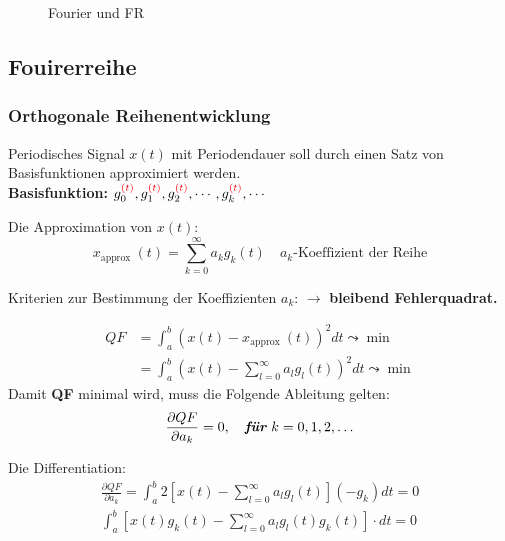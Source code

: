 \begin{figure}[H]
    \centering
    \subfigbottomskip=10pt
    \subfigcapskip=3pt
    \caption{Fourier und FR}
    \label{fig:Fourier und FR}
\end{figure}


\subsection{\textbf{Fouirerreihe}}
\subsubsection{\textbf{Orthogonale Reihenentwicklung}}
Periodisches Signal $x(t)$ mit Periodendauer soll durch einen Satz von Basisfunktionen approximiert werden.\\
\textbf{Basisfunktion:} $g_0^{\textcolor{red}{(t)}},g_1^{\textcolor{red}{(t)}},g_2^{\textcolor{red}{(t)}},\cdots,g_k^{\textcolor{red}{(t)}},\cdots$

Die Approximation von $x(t)$:\\
\begin{equation}
    x_{\text {approx }}(t)=\sum_{k=0}^{\infty} a_{k} g_{k}(t) \quad \mbox {$a_k$-Koeffizient der Reihe}
\end{equation}

Kriterien zur Bestimmung der Koeffizienten $a_k$: $\rightarrow$ \textbf{bleibend Fehlerquadrat.}

\begin{equation}
\begin{aligned}
    Q F &=\int_{a}^{b}\left(x(t)-x_{\text {approx }}(t)\right)^{2} d t \leadsto \min \\
       &=\int_{a}^{b}\left(x(t)-\sum_{l=0}^{\infty} a_{l} g_{l}(t)\right)^{2} d t \leadsto \min
\end{aligned}
\end{equation}
Damit \textbf{QF} minimal wird, muss die Folgende Ableitung gelten:\\
\begin{equation}
\frac{\partial Q F}{\partial a_{k}}=0, \quad \mbox{\textit{\textbf{für}}} \; k=0,1,2, \ldots
\end{equation}

Die Differentiation:\\
\begin{equation}
\begin{split}
    \frac{\partial Q F}{\partial a_{k}}=\int_{a}^{b} 2\left[x(t)-\sum_{l=0}^{\infty} a_{l} g_{l}(t)\right]\left(-g_{k}\right) d t=0\\
    \int_{a}^{b}\left[x(t) g_{k}(t)-\sum_{l=0}^{\infty} a_{l} g_{l}(t) g_{k}(t)\right] \cdot d t=0
\end{split}
\end{equation}

